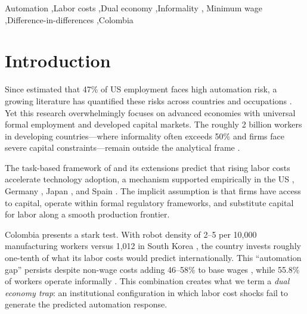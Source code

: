 \documentclass[5p,times,authoryear]{elsarticle}
\begin{document}
\begin{frontmatter}

\begin{keyword}
  Automation \sep Labor costs \sep Dual economy \sep Informality \sep
  Minimum wage \sep Difference-in-differences \sep Colombia
\end{keyword}

\end{frontmatter}


\section{Introduction}
\label{sec:introduction}

Since \citet{frey2017future} estimated that 47\% of US employment faces high automation risk, a growing literature has quantified these risks across countries and occupations \citep{arntz2016, webb2020, eloundou2023gpts}. Yet this research overwhelmingly focuses on advanced economies with universal formal employment and developed capital markets. The roughly 2 billion workers in developing countries---where informality often exceeds 50\% and firms face severe capital constraints---remain outside the analytical frame \citep{laporta2014, arias2023informality}.

The task-based framework of \citet{acemoglu2019automation} and its extensions \citep{acemoglu2020robots, acemoglu2022tasks} predict that rising labor costs accelerate technology adoption, a mechanism supported empirically in the US \citep{acemoglu2020robots}, Germany \citep{dauth2021}, Japan \citep{adachi2022}, and Spain \citep{koch2021}. The implicit assumption is that firms have access to capital, operate within formal regulatory frameworks, and substitute capital for labor along a smooth production frontier.

Colombia presents a stark test. With robot density of 2--5 per 10,000 manufacturing workers versus 1,012 in South Korea \citep{ifr2024}, the country invests roughly one-tenth of what its labor costs would predict internationally. This ``automation gap'' persists despite non-wage costs adding 46--58\% to base wages \citep{anif2018}, while 55.8\% of workers operate informally \citep{arias2023informality}. This combination creates what we term a \emph{dual economy trap}: an institutional configuration in which labor cost shocks fail to generate the predicted automation response.
\end{document}

